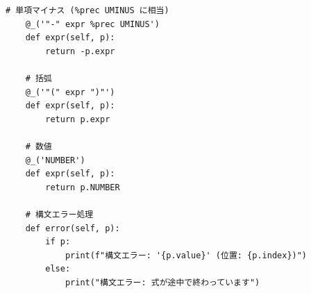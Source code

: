 \documentclass{jarticle}
\begin{document}
\begin{Verbatim}
# 単項マイナス (%prec UMINUS に相当)
    @_('"-" expr %prec UMINUS')
    def expr(self, p):
        return -p.expr

    # 括弧
    @_('"(" expr ")"')
    def expr(self, p):
        return p.expr

    # 数値
    @_('NUMBER')
    def expr(self, p):
        return p.NUMBER

    # 構文エラー処理
    def error(self, p):
        if p:
            print(f"構文エラー: '{p.value}' (位置: {p.index})")
        else:
            print("構文エラー: 式が途中で終わっています")
\end{Verbatim}
\end{document}
